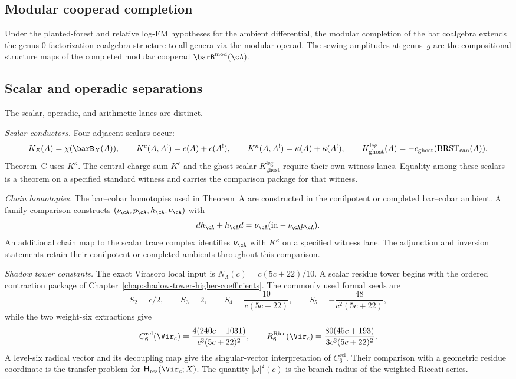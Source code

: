 \subsection*{Modular cooperad completion}
\label{sec:concordance-modular-cooperad-completion}

Under the planted-forest and relative log-FM hypotheses for the
ambient differential, the modular completion of the bar coalgebra
extends the genus-$0$ factorization coalgebra structure to all genera
via the modular operad. The sewing amplitudes at genus~$g$ are the
compositional structure maps of the completed modular cooperad
$\barB^{\mathrm{mod}}(\cA)$.

\subsection*{Scalar and operadic separations}
\label{sec:guide-architectural-sharpenings}

The scalar, operadic, and arithmetic lanes are distinct.

\smallskip\noindent\emph{Scalar conductors.}
Four adjacent scalars occur:
\[
K_E(A)=\chi(\barB_X(A)),\qquad
K^c(A,A^!)=c(A)+c(A^!),\qquad
K^\kappa(A,A^!)=\kappa(A)+\kappa(A^!),\qquad
K_{\mathrm{ghost}}^{\mathrm{leg}}(A)
=-c_{\mathrm{ghost}}(\mathrm{BRST}_{\mathrm{can}}(A)).
\]
Theorem~C uses $K^\kappa$. The central-charge sum $K^c$ and the ghost
scalar $K_{\mathrm{ghost}}^{\mathrm{leg}}$ require their own witness
lanes. Equality among these scalars is a theorem on a specified
standard witness and carries the comparison package for that witness.

\smallskip\noindent\emph{Chain homotopies.}
The bar--cobar homotopies used in Theorem~A are constructed in the
conilpotent or completed bar--cobar ambient.  A family comparison
constructs $(\iota_\cA,p_\cA,h_\cA,\nu_\cA)$ with
\[
 dh_\cA+h_\cA d
 =\nu_\cA(\mathrm{id}-\iota_\cA p_\cA).
\]
An additional chain map to the scalar trace complex identifies
$\nu_\cA$ with $K^\kappa$ on a specified witness lane.  The
adjunction and inversion statements retain their conilpotent or
completed ambients throughout this comparison.

\smallskip\noindent\emph{Shadow tower constants.}
The exact Virasoro local input is
$N_\Lambda(c)=c(5c+22)/10$.  A scalar residue tower begins with the
ordered contraction package of
Chapter~\ref{chap:shadow-tower-higher-coefficients}.  The commonly
used formal seeds are
\[
S_2=c/2,\qquad S_3=2,\qquad
S_4=\frac{10}{c(5c+22)},\qquad
S_5=-\frac{48}{c^2(5c+22)},
\]
while the two weight-six extractions give
\[
C_6^{\mathrm{rel}}(\Vir_c)=\frac{4(240c+1031)}{c^3(5c+22)^2},
\qquad
R_6^{\mathrm{Ricc}}(\Vir_c)=
\frac{80(45c+193)}{3c^3(5c+22)^2}.
\]
A level-six radical vector and its decoupling map give the
singular-vector interpretation of $C_6^{\mathrm{rel}}$.  Their
comparison with a geometric residue coordinate is the transfer problem
for $\mathsf H_{\mathrm{res}}(\Vir_c;X)$.  The quantity
$|\omega|^2(c)$ is the branch radius of the weighted Riccati series.

